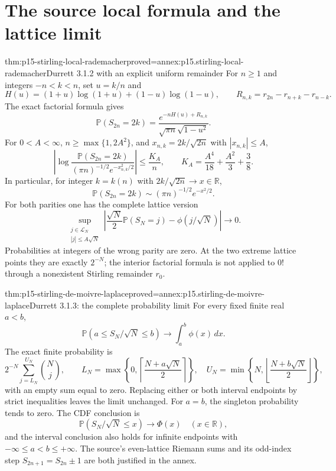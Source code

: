\section{The source local formula and the lattice limit}
\label{sec:p15-stirling-local-normal}

\begin{hbtheorem}{thm:p15-stirling-local-rademacher}{proved=annex:p15.stirling-local-rademacher}{Durrett 3.1.2 with an explicit uniform remainder}
For \(n\geq1\) and integers \(-n<k<n\), set \(u=k/n\) and
\[
 H(u)=(1+u)\log(1+u)+(1-u)\log(1-u),\qquad
 R_{n,k}=r_{2n}-r_{n+k}-r_{n-k}.
\]
The exact factorial formula gives
\[
 \mathbb P(S_{2n}=2k)
 =\frac{e^{-nH(u)+R_{n,k}}}{\sqrt{\pi n}\sqrt{1-u^2}}.
\]
For \(0<A<\infty\), \(n\geq\max\{1,2A^2\}\), and
\(x_{n,k}=2k/\sqrt{2n}\) with \(|x_{n,k}|\leq A\),
\[
 \left|\log
 \frac{\mathbb P(S_{2n}=2k)}
 {(\pi n)^{-1/2}e^{-x_{n,k}^2/2}}\right|
 \leq \frac{K_A}{n},
 \qquad K_A=\frac{A^4}{18}+\frac{A^2}{3}+\frac38.
\]
In particular, for integer \(k=k(n)\) with
\(2k/\sqrt{2n}\to x\in\mathbb R\),
\[
 \mathbb P(S_{2n}=2k)\sim(\pi n)^{-1/2}e^{-x^2/2}.
\]
For both parities one has the complete lattice version
\[
 \sup_{\substack{j\in\mathcal L_N\\ |j|\leq A\sqrt N}}
 \left|\frac{\sqrt N}{2}\mathbb P(S_N=j)
              -\phi(j/\sqrt N)\right|\longrightarrow0.
\]
Probabilities at integers of the wrong parity are zero.
At the two extreme lattice points they are exactly \(2^{-N}\);
the interior factorial formula is not applied to \(0!\) through
a nonexistent Stirling remainder \(r_0\).
\end{hbtheorem}

\begin{hbtheorem}{thm:p15-stirling-de-moivre-laplace}{proved=annex:p15.stirling-de-moivre-laplace}{Durrett 3.1.3: the complete probability limit}
For every fixed finite real \(a<b\),
\[
 \mathbb P(a\leq S_N/\sqrt N\leq b)
       \longrightarrow \int_a^b\phi(x)\,dx.
\]
The exact finite probability is
\[
 2^{-N}\sum_{j=L_N}^{U_N}\binom Nj,\qquad
 L_N=\max\!\left\{0,\left\lceil\frac{N+a\sqrt N}{2}\right\rceil\right\},
 \quad
 U_N=\min\!\left\{N,\left\lfloor\frac{N+b\sqrt N}{2}\right\rfloor\right\},
\]
with an empty sum equal to zero.
Replacing either or both interval endpoints by strict inequalities
leaves the limit unchanged. For \(a=b\), the singleton
probability tends to zero. The CDF conclusion is
\[
 \mathbb P(S_N/\sqrt N\leq x)\to\Phi(x)
                          \quad(x\in\mathbb R),
\]
and the interval conclusion also holds for infinite endpoints with
\(-\infty\leq a<b\leq+\infty\).
The source's even-lattice Riemann sums and its odd-index step
\(S_{2n+1}=S_{2n}\pm1\) are both justified in the annex.
\end{hbtheorem}


